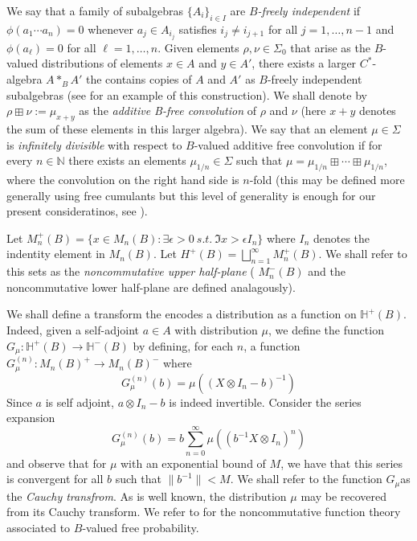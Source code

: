 \documentclass[11pt]{amsart}
\begin{document}
We say that a family of subalgebras $\{A_{i} \}_{i\in I}$ are \textit{$B$-freely independent} if 
$\phi(a_{1}\cdots a_{n}) = 0$ whenever $a_{j} \in A_{i_{j}}$ satisfies $i_{j} \neq i_{j+1}$ for all $j=1,\ldots,n-1$
and $\phi(a_{\ell})=0$ for all $\ell = 1,\ldots,n$.  Given elements $\rho, \nu \in \Sigma_{0}$ that arise as the $B$-valued distributions of elements $x \in A$
and $y \in A'$, there exists a larger $C^{\ast}$-algebra $A \ast_{B} A'$ the contains copies of $A$ and $A'$ as $B$-freely independent subalgebras
 (see \cite{vo5} for an example of this construction).
We shall denote by $\rho \boxplus \nu := \mu_{x+y}$ as the \textit{additive B-free convolution} of $\rho$ and $\nu$ (here $x+y$ denotes the sum of these elements in this larger algebra).
  We say that an element $\mu \in \Sigma$
is \textit{infinitely divisible} with respect to $B$-valued additive free convolution if for every $n\in \mathbb{N}$ there exists an elements $\mu_{1/n} \in \Sigma$
such that $\mu = \mu_{1/n} \boxplus \cdots \boxplus \mu_{1/n}$, where the convolution on the right hand side is $n$-fold (this may be defined more generally
using free cumulants but this level of generality is enough for our present consideratinos, see \cite{Speichop}).

Let $M_{n}^{+}(B) = \{x\in M_{n}(B) : \exists \epsilon > 0 \ s.t. \ \Im{x}> \epsilon I_{n} \}$ where $I_{n}$ denotes the 
indentity element in $M_{n}(B)$.  
Let $H^{+}(B) = \bigsqcup_{n=1}^{\infty} M_{n}^{+}(B)$.  We shall refer to this sets as the
 \textit{noncommutative upper half-plane} ( $M_{n}^{-}(B)$ and the noncommutative lower half-plane are defined analagously).

We shall define a transform the encodes a distribution as a function on $\mathbb{H}^{+}(B)$.
Indeed, given a self-adjoint $a\in A$ with distribution $\mu$, we define the function
$G_{\mu}:\mathbb{H}^{+}(B) \rightarrow \mathbb{H}^{-}(B)$
by defining, for each $n$, a function $G_{\mu}^{(n)}: M_{n}(B)^{+} \rightarrow M_{n}(B)^{-}$
where $$G_{\mu}^{(n)}(b) = \mu((X\otimes I_{n}-b)^{-1})$$
Since $a$ is self adjoint, $a\otimes I_{n} -b$ is indeed invertible.  Consider the  series expansion
$$G_{\mu}^{(n)}(b)= b\sum_{n=0}^{\infty}\mu((b^{-1}X\otimes I_{n})^{n})$$
and observe that for $\mu$ with an exponential bound of $M$, we have that
this series is convergent for all $b$ such that $\|b^{-1} \| < M$.  We shall refer to the function $G_{\mu} $as the \textit{Cauchy transfrom}.
As is well known, the distribution $\mu$ may be recovered from its Cauchy transform.
We refer to \cite{vo5} for the noncommutative function theory associated to $B$-valued free probability.
\end{document}
